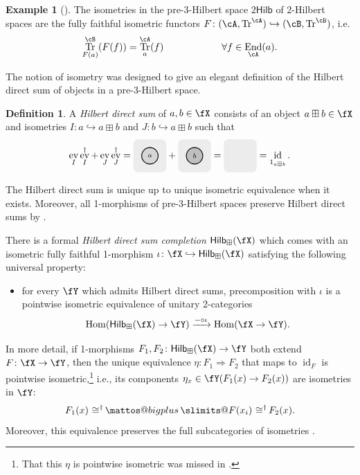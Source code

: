 \documentclass[12pt, reqno]{amsart}
\makeatletter
\newcommand{\tikzmath}[2][]
{\vcenter{\hbox{\begin{tikzpicture}[#1]#2\end{tikzpicture}}}
}
\DeclareMathOperator{\End}{End}
\DeclareMathOperator{\ev}{ev}
\DeclareMathOperator{\Hom}{Hom}
\DeclareMathOperator{\id}{id}
\DeclareMathOperator{\Tr}{Tr}
\newcommand{\Hilb}{\mathsf{Hilb}}
\theoremstyle{plain}
\theoremstyle{definition}
\newtheorem{defn}[thm]{Definition}
\newtheorem{ex}[thm]{Example}
\DeclareMathOperator{\isomeq}{\mathbin{\,\cong^\dag}}
\newcommand{\bigboxplus}{%
  \DOTSB\mathop{\mathpalette\mattos@bigplus\relax}\slimits@
}
\newcommand\mattos@bigplus[2]{%
  \vcenter{\hbox{%
    \sbox\z@{$#1\sum$}%
    \resizebox{!}{0.9\dimexpr\ht\z@+\dp\z@}{\raisebox{\depth}{$\m@th#1\boxplus$}}%
  }}%
  \vphantom{\sum}%
}
\makeatother
\begin{document}
\begin{ex}[{\cite[Ex.~4.13]{MR5078555}}]
The isometries in the pre-3-Hilbert space $2\Hilb$ of 2-Hilbert spaces are the fully faithful isometric functors $F\colon (\cA,\Tr^\cA)\hookrightarrow (\cB,\Tr^\cB)$, i.e. 
$$
\Tr^\cB_{F(a)}(F(f))=\Tr^\cA_a(f) \qquad\qquad\qquad \forall f\in \End_\cA(a).
$$
\end{ex}

The notion of isometry was designed to give an elegant definition of the Hilbert direct sum of objects in a pre-3-Hilbert space.

\begin{defn}
\label{defn:HilbertDirectSum}
A \emph{Hilbert direct sum} of $a,b\in \fX$ consists of an object $a\boxplus b\in \fX$ and isometries $I\colon a\hookrightarrow a\boxplus b$ and $J\colon  b\hookrightarrow a\boxplus b$ such that 
$$
\ev_I\ev_I^\dag + \ev_J\ev_J^\dag 
=
\tikzmath{
\fill[lightgray!30,rounded corners=5pt]
(-.6,-.6) rectangle (.6,.6);
\draw[fill=lightgray!65, thick] (0,0) circle (.3);
\node at (0,0) {$\scriptstyle a$};
}
+
\tikzmath{
\fill[lightgray!30,rounded corners=5pt]
(-.6,-.6) rectangle (.6,.6);
\draw[fill=lightgray, thick] (0,0) circle (.3);
\node at (0,0) {$\scriptstyle b$};
}
=
\tikzmath{
\fill[lightgray!30,rounded corners=5pt]
(-.6,-.6) rectangle (.6,.6);
}
=
\id_{1_{a\boxplus b}}.
$$

The Hilbert direct sum is unique up to unique isometric equivalence when it exists.
Moreover, all 1-morphisms of pre-3-Hilbert spaces preserve Hilbert direct sums by \cite[Lem.~4.23]{MR5078555}.

There is a formal \emph{Hilbert direct sum completion} $\Hilb_{\boxplus}(\fX)$ which comes with an isometric fully faithful 1-morphism $\iota\colon \fX \hookrightarrow \Hilb_{\boxplus}(\fX)$
satisfying the following universal property: \begin{itemize} 
\item for every $\fY$ which admits Hilbert direct sums, precomposition with $\iota$ is a
pointwise isometric equivalence of unitary 2-categories
\[
\Hom(\Hilb_{\boxplus}(\fX)\to \fY)
\xrightarrow{-\circ \iota}
\Hom(\fX\to \fY).
\]
\end{itemize}
In more detail, if 1-morphisms $F_1,F_2\colon  \Hilb_\boxplus(\fX)\to \fY$ both extend $F\colon \fX\to \fY$, then the unique equivalence $\eta\colon  F_1\Rightarrow F_2$ that maps to $\id_F$ is
pointwise isometric,\footnote{That this $\eta$ is pointwise isometric was missed in \cite[Prop.~4.28]{MR5078555}.} 
i.e., its components $\eta_x\in \fY(F_1(x)\to F_2(x))$ are isometries in $\fY$:
$$
F_1(x)\isomeq \bigboxplus F(x_i) \isomeq F_2(x).
$$
Moreover, this equivalence preserves the full subcategories of isometries \cite[Prop.~4.28]{MR5078555}.
\end{defn}
\end{document}
